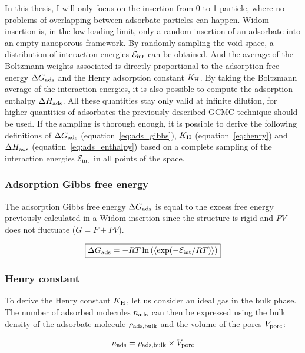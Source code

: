 \documentclass[main.tex]{subfiles}
\begin{document}
In this thesis, I will only focus on the insertion from 0 to 1 particle, where no problems of overlapping between adsorbate particles can happen. Widom insertion is, in the low-loading limit, only a random insertion of an adsorbate into an empty nanoporous framework. By randomly sampling the void space, a distribution of interaction energies $\mathcal{E}_{\text{int}}$ can be obtained. And the average of the Boltzmann weights associated is directly proportional to the adsorption free energy $\Delta G_{\text{ads}}$ and the Henry adsorption constant $K_{\text{H}}$. By taking the Boltzmann average of the interaction energies, it is also possible to compute the adsorption enthalpy $\Delta H_{\text{ads}}$. All these quantities stay only valid at infinite dilution, for higher quantities of adsorbates the previously described GCMC technique should be used. If the sampling is thorough enough, it is possible to derive the following definitions of $\Delta G_{\text{ads}}$ (equation~\ref{eq:ads_gibbs}), $K_{\text{H}}$ (equation~\ref{eq:henry}) and $\Delta H_{\text{ads}}$ (equation~\ref{eq:ads_enthalpy}) based on a complete sampling of the interaction energies $\mathcal{E}_{\text{int}}$ in all points of the space. 

\subsubsection{Adsorption Gibbs free energy}

The adsorption Gibbs free energy $\Delta G_{\text{ads}}$ is equal to the excess free energy previously calculated in a Widom insertion since the structure is rigid and $PV$ does not fluctuate ($G = F + PV$). 

\begin{equation}\label{eq:ads_gibbs}
  \boxed{
  \Delta G_{\text{ads}} = -RT \ln\left(\langle \exp(-\mathcal{E}_{\text{int}}/RT) \rangle\right)
  }
\end{equation}

\subsubsection{Henry constant}

To derive the Henry constant $K_{\text{H}}$, let us consider an ideal gas in the bulk phase. The number of adsorbed molecules $n_{\text{ads}}$ can then be expressed using the bulk density of the adsorbate molecule $\rho_{\text{ads,bulk}}$ and the volume of the pores $V_{\text{pore}}$:

\begin{equation}\label{eq:1}
    n_{\text{ads}} = \rho_{\text{ads,bulk}} \times V_{\text{pore}}  
\end{equation}
\end{document}
